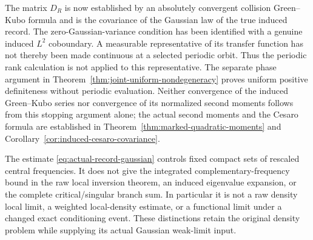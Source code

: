 \begin{remark}
\label{rem:gaussian-versus-raw}
The matrix $D_R$ is now established by an absolutely convergent
collision Green--Kubo formula and is the covariance of the Gaussian
law of the true induced record. The zero-Gaussian-variance condition
has been identified with a genuine induced $L^2$ coboundary. A
measurable representative of its transfer function has not thereby
been made continuous at a selected periodic orbit. Thus the periodic
rank calculation is not applied to this representative. The separate
phase argument in Theorem~\ref{thm:joint-uniform-nondegeneracy} proves
uniform positive definiteness without periodic evaluation. Neither
convergence of the induced Green--Kubo series nor convergence of its
normalized second moments follows from this stopping argument alone;
the actual second moments and the Cesaro formula are established in
Theorem~\ref{thm:marked-quadratic-moments} and
Corollary~\ref{cor:induced-cesaro-covariance}.

The estimate \eqref{eq:actual-record-gaussian} controls fixed compact
sets of rescaled central frequencies. It does not give the integrated
complementary-frequency bound in the raw local inversion theorem, an
induced eigenvalue expansion, or the complete critical/singular branch
sum. In particular it is not a raw density local limit, a weighted
local-density estimate, or a functional limit under a changed exact
conditioning event. These distinctions retain the original density
problem while supplying its actual Gaussian weak-limit input.
\end{remark}
